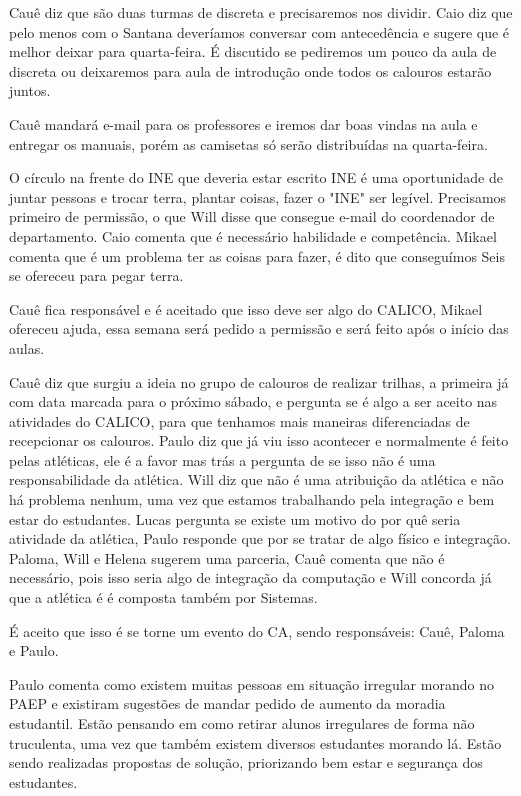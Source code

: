 \documentclass{ata-calico}
\begin{document}
Cauê diz que são duas turmas de discreta e precisaremos nos dividir. Caio diz que pelo menos com o Santana deveríamos conversar com antecedência e sugere que é melhor deixar para quarta-feira. É discutido se pediremos um pouco da aula de discreta ou deixaremos para aula de introdução onde todos os calouros estarão juntos.

Cauê mandará e-mail para os professores e iremos dar boas vindas na aula e entregar os manuais, porém as camisetas só serão distribuídas na quarta-feira.

O círculo na frente do INE que deveria estar escrito INE é uma oportunidade de juntar pessoas e trocar terra, plantar coisas, fazer o "INE" ser legível. Precisamos primeiro de permissão, o que Will disse que consegue e-mail do coordenador de departamento. Caio comenta que é necessário habilidade e competência. Mikael comenta que é um problema ter as coisas para fazer, é dito que conseguímos Seis se ofereceu para pegar terra.

Cauê fica responsável e é aceitado que isso deve ser algo do CALICO, Mikael ofereceu ajuda, essa semana será pedido a permissão e será feito após o início das aulas.

Cauê diz que surgiu a ideia no grupo de calouros de realizar trilhas, a primeira já com data marcada para o próximo sábado, e pergunta se é algo a ser aceito nas atividades do CALICO, para que tenhamos mais maneiras diferenciadas de recepcionar os calouros. Paulo diz que já viu isso acontecer e normalmente é feito pelas atléticas, ele é a favor mas trás a pergunta de se isso não é uma responsabilidade da atlética. Will diz que não é uma atribuição da atlética e não há problema nenhum, uma vez que estamos trabalhando pela integração e bem estar do estudantes. Lucas pergunta se existe um motivo do por quê seria atividade da atlética, Paulo responde que por se tratar de algo físico e integração. Paloma, Will e Helena sugerem uma parceria, Cauê comenta que não é necessário, pois isso seria algo de integração da computação e Will concorda já que a atlética é é composta também por Sistemas.

É aceito que isso é se torne um evento do CA, sendo responsáveis: Cauê, Paloma e Paulo.

Paulo comenta como existem muitas pessoas em situação irregular morando no PAEP e existiram sugestões de mandar pedido de aumento da moradia estudantil. Estão pensando em como retirar alunos irregulares de forma não truculenta, uma vez que também existem diversos estudantes morando lá. Estão sendo realizadas propostas de solução, priorizando bem estar e segurança dos estudantes.
\end{document}
